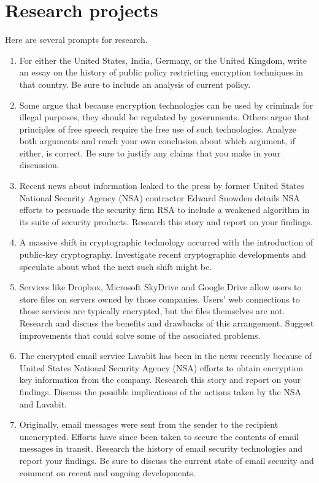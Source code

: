 \documentclass{book}
\theoremstyle{plain}
\theoremstyle{definition}
\begin{document}
\chapter{Research projects}
Here are several prompts for research.
\begin{enumerate}
\item For either the United States, India, Germany, or the United Kingdom, write an essay on the history of public policy restricting encryption techniques in that country. Be sure to include an analysis of current policy.
\item Some argue that because encryption technologies can be used by criminals for illegal purposes, they should be regulated by governments. Others argue that principles of free speech require the free use of such technologies. Analyze both arguments and reach your own conclusion about which argument, if either, is correct. Be sure to justify any claims that you make in your discussion.
\item Recent news about information leaked to the press by former United States National Security Agency (NSA) contractor Edward Snowden details NSA efforts to persuade the security firm RSA to include a weakened algorithm in its suite of security products. Research this story and report on your findings.
\item A massive shift in cryptographic technology occurred with the introduction of public-key cryptography. Investigate recent cryptographic developments and speculate about what the next such shift might be.
\item Services like Dropbox, Microsoft SkyDrive and Google Drive allow users to store files on servers owned by those companies. Users' web connections to those services are typically encrypted, but the files themselves are not. Research and discuss the benefits and drawbacks of this arrangement. Suggest improvements that could solve some of the associated problems.
\item The encrypted email service Lavabit has been in the news recently because of United States National Security Agency (NSA) efforts to obtain encryption key information from the company. Research this story and report on your findings. Discuss the possible implications of the actions taken by the NSA and Lavabit.
\item Originally, email messages were sent from the sender to the recipient unencrypted. Efforts have since been taken to secure the contents of email messages in transit. Research the history of email security technologies and report your findings. Be sure to discuss the current state of email security and comment on recent and ongoing developments.

\end{enumerate}
\end{document}
